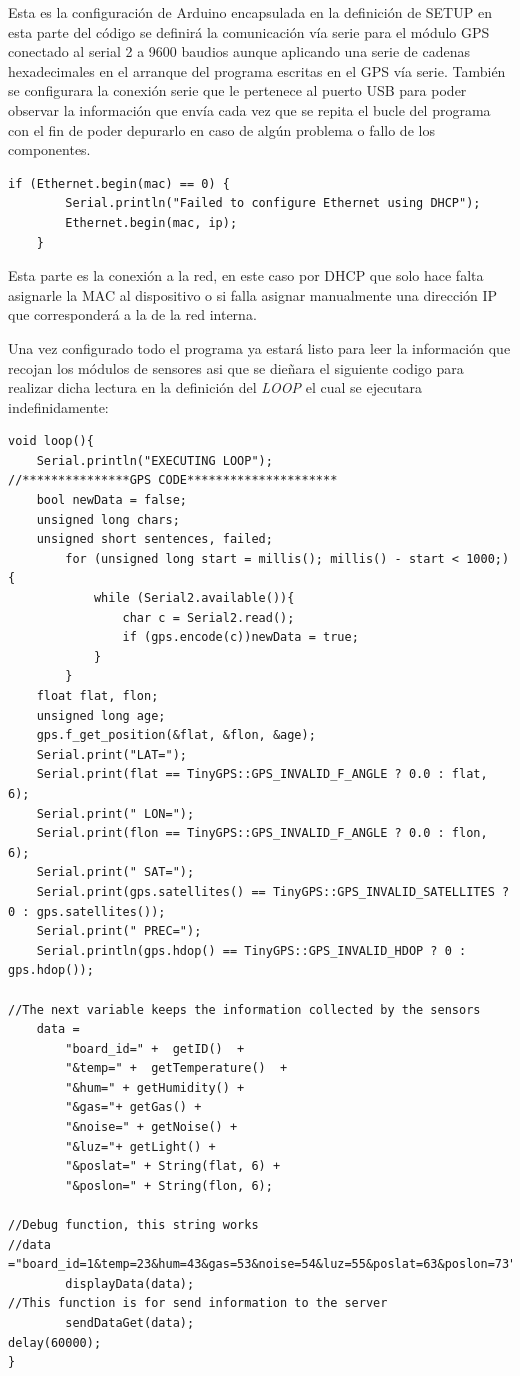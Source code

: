 Esta es la configuración de Arduino encapsulada en la definición de SETUP en esta parte del código se definirá la comunicación vía serie para el módulo GPS conectado al serial 2 a 9600 baudios aunque aplicando una serie de cadenas hexadecimales en el arranque del programa escritas en el GPS vía serie.
También se configurara la conexión serie que le pertenece al puerto USB para poder observar la información que envía cada vez que se repita el bucle del programa con el fin de poder depurarlo en caso de algún problema o fallo de los componentes.\\

\begin{lstlisting}[caption=Conexion a la Red, label=networkcon]
	if (Ethernet.begin(mac) == 0) {
		Serial.println("Failed to configure Ethernet using DHCP");
		Ethernet.begin(mac, ip);
	}
\end{lstlisting}
Esta parte es la conexión a la red, en este caso por DHCP que solo hace falta asignarle la MAC al dispositivo o si falla asignar manualmente una dirección IP que corresponderá a la de la red interna.

Una vez configurado todo el programa ya estará listo para leer la información que recojan los módulos de sensores asi que se dieñara el siguiente codigo para realizar dicha lectura en la definición del \textit{LOOP} el cual se ejecutara indefinidamente:\\

\begin{lstlisting}[caption=Función \textit{LOOP} del código, label=codeloop]
void loop(){
	Serial.println("EXECUTING LOOP");
//***************GPS CODE*********************
	bool newData = false;
	unsigned long chars;
	unsigned short sentences, failed;
		for (unsigned long start = millis(); millis() - start < 1000;){
			while (Serial2.available()){
				char c = Serial2.read();
				if (gps.encode(c))newData = true;
			}
		}
	float flat, flon;
	unsigned long age;
	gps.f_get_position(&flat, &flon, &age);
	Serial.print("LAT=");
	Serial.print(flat == TinyGPS::GPS_INVALID_F_ANGLE ? 0.0 : flat, 6);
	Serial.print(" LON=");
	Serial.print(flon == TinyGPS::GPS_INVALID_F_ANGLE ? 0.0 : flon, 6);
	Serial.print(" SAT=");
	Serial.print(gps.satellites() == TinyGPS::GPS_INVALID_SATELLITES ? 0 : gps.satellites());
	Serial.print(" PREC=");
	Serial.println(gps.hdop() == TinyGPS::GPS_INVALID_HDOP ? 0 : gps.hdop());

//The next variable keeps the information collected by the sensors
	data = 
		"board_id=" +  getID()  +
		"&temp=" +  getTemperature()  + 
		"&hum=" + getHumidity() +
		"&gas="+ getGas() + 
		"&noise=" + getNoise() +
		"&luz="+ getLight() + 
		"&poslat=" + String(flat, 6) + 
		"&poslon=" + String(flon, 6);

//Debug function, this string works
//data ="board_id=1&temp=23&hum=43&gas=53&noise=54&luz=55&poslat=63&poslon=73";
		displayData(data);
//This function is for send information to the server
		sendDataGet(data);
delay(60000);
}
\end{lstlisting}

